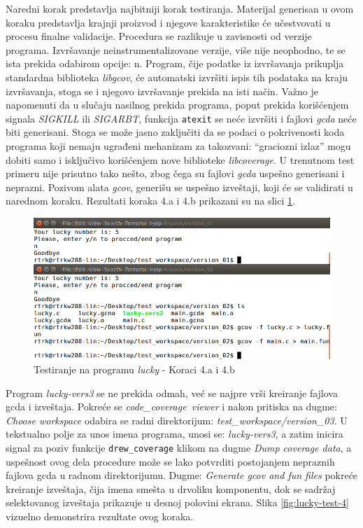 \documentclass[12pt,oneside]{memoir}
\newcommand{\kod}[1]{\texttt{#1}}
\newcommand{\strano}[1]{\textit{#1}}
\begin{document}
Naredni korak predstavlja najbitniji korak testiranja. Materijal generisan u ovom koraku predstavlja krajnji proizvod i njegove karakteristike će učestvovati u procesu finalne validacije. Procedura se razlikuje u zavisnosti od verzije programa. Izvršavanje neinstrumentalizovane verzije, više nije neophodno, te se ista prekida odabirom opcije: n. Program, čije podatke iz izvršavanja prikuplja standardna biblioteka \strano{libgcov}, će automatski izvršiti ispis tih podataka na kraju izvršavanja, stoga se i njegovo izvršavanje prekida na isti način. Važno je napomenuti da u slučaju nasilnog prekida programa, poput prekida korišćenjem signala \strano{SIGKILL} ili \strano{SIGARBT}, funkcija \kod{atexit} se neće izvršiti i fajlovi \strano{gcda} neće biti generisani. Stoga se može jasno zaključiti da se podaci o pokrivenosti koda programa koji nemaju ugrađeni mehanizam za takozvani: “graciozni izlaz” mogu dobiti samo i isključivo korišćenjem nove biblioteke \strano{libcoverage}. U trenutnom test primeru nije prisutno tako nešto, zbog čega su fajlovi \strano{gcda} uspešno generisani i neprazni. Pozivom alata \strano{gcov}, generišu se uspešno izveštaji, koji će se validirati u narednom koraku. Rezultati koraka 4.a i 4.b prikazani su na slici \ref{fig:lucky-test-3}.

\begin{figure}[!ht]
  \centering
  \includegraphics[width=\textwidth]{img/lucky3-ng.png}
  \caption{Testiranje na programu \strano{lucky} - Koraci 4.a i 4.b}
  \label{fig:lucky-test-3}
\end{figure}

Program \strano{lucky-vers3} se ne prekida odmah, već se najpre vrši kreiranje fajlova gcda i izveštaja. Pokreće se \strano{code\_coverage\ viewer} i nakon pritiska na dugme: \strano{Choose workspace} odabira se radni direktorijum: \strano{test\_workspace/version\_03}. U tekstualno polje za unos imena programa, unosi se: \strano{lucky-vers3}, a zatim inicira signal za poziv funkcije \kod{drew\_coverage} klikom na dugme \strano{Dump coverage data}, a uspešnost ovog dela procedure može se lako potvrditi postojanjem nepraznih fajlova gcda u radnom direktorijumu. Dugme: \strano{Generate gcov and fun files} pokreće kreiranje izveštaja, čija imena smešta u drvoliku komponentu, dok se sadržaj selektovanog izveštaja prikazuje u desnoj polovini ekrana. Slika \ref{fig:lucky-test-4} vizuelno demonstrira rezultate ovog koraka.
\end{document}
